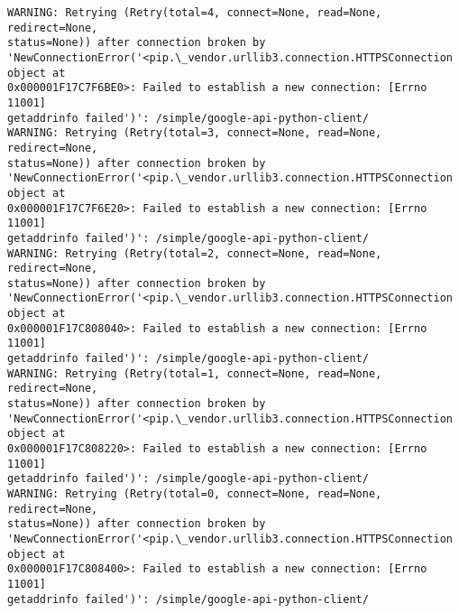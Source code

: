 \documentclass[11pt]{article}
\begin{document}
    \begin{Verbatim}[commandchars=\\\{\}]
WARNING: Retrying (Retry(total=4, connect=None, read=None, redirect=None,
status=None)) after connection broken by
'NewConnectionError('<pip.\_vendor.urllib3.connection.HTTPSConnection object at
0x000001F17C7F6BE0>: Failed to establish a new connection: [Errno 11001]
getaddrinfo failed')': /simple/google-api-python-client/
WARNING: Retrying (Retry(total=3, connect=None, read=None, redirect=None,
status=None)) after connection broken by
'NewConnectionError('<pip.\_vendor.urllib3.connection.HTTPSConnection object at
0x000001F17C7F6E20>: Failed to establish a new connection: [Errno 11001]
getaddrinfo failed')': /simple/google-api-python-client/
WARNING: Retrying (Retry(total=2, connect=None, read=None, redirect=None,
status=None)) after connection broken by
'NewConnectionError('<pip.\_vendor.urllib3.connection.HTTPSConnection object at
0x000001F17C808040>: Failed to establish a new connection: [Errno 11001]
getaddrinfo failed')': /simple/google-api-python-client/
WARNING: Retrying (Retry(total=1, connect=None, read=None, redirect=None,
status=None)) after connection broken by
'NewConnectionError('<pip.\_vendor.urllib3.connection.HTTPSConnection object at
0x000001F17C808220>: Failed to establish a new connection: [Errno 11001]
getaddrinfo failed')': /simple/google-api-python-client/
WARNING: Retrying (Retry(total=0, connect=None, read=None, redirect=None,
status=None)) after connection broken by
'NewConnectionError('<pip.\_vendor.urllib3.connection.HTTPSConnection object at
0x000001F17C808400>: Failed to establish a new connection: [Errno 11001]
getaddrinfo failed')': /simple/google-api-python-client/
    \end{Verbatim}
\end{document}
